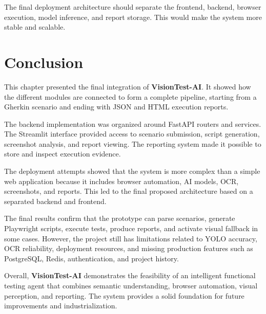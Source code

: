 The final deployment architecture should separate the frontend, backend, browser execution, model inference, and report storage. This would make the system more stable and scalable.

\section{Conclusion}
\label{sec:ch5_conclusion}

This chapter presented the final integration of \textbf{VisionTest-AI}. It showed how the different modules are connected to form a complete pipeline, starting from a Gherkin scenario and ending with JSON and HTML execution reports.

The backend implementation was organized around FastAPI routers and services. The Streamlit interface provided access to scenario submission, script generation, screenshot analysis, and report viewing. The reporting system made it possible to store and inspect execution evidence.

The deployment attempts showed that the system is more complex than a simple web application because it includes browser automation, AI models, OCR, screenshots, and reports. This led to the final proposed architecture based on a separated backend and frontend.

The final results confirm that the prototype can parse scenarios, generate Playwright scripts, execute tests, produce reports, and activate visual fallback in some cases. However, the project still has limitations related to YOLO accuracy, OCR reliability, deployment resources, and missing production features such as PostgreSQL, Redis, authentication, and project history.

Overall, \textbf{VisionTest-AI} demonstrates the feasibility of an intelligent functional testing agent that combines semantic understanding, browser automation, visual perception, and reporting. The system provides a solid foundation for future improvements and industrialization.
